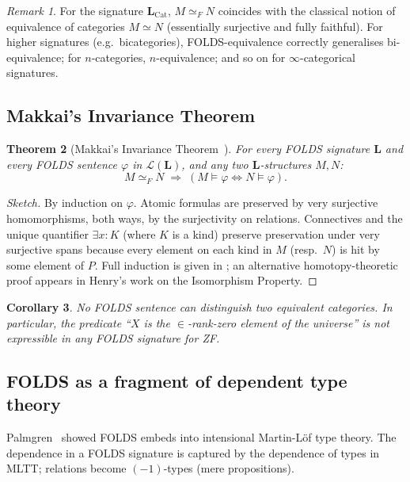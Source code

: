 \documentclass[12pt]{article}
\newtheorem{theorem}{Theorem}[section]
\newtheorem{corollary}[theorem]{Corollary}
\theoremstyle{definition}
\theoremstyle{remark}
\newtheorem{remark}[theorem]{Remark}
\begin{document}
\begin{remark}
For the signature $\mathbf{L}_{\mathrm{Cat}}$, $M\simeq_F N$ coincides with the
classical notion of equivalence of categories $M\simeq N$ (essentially surjective and
fully faithful). For higher signatures (e.g.\ bicategories), FOLDS-equivalence
correctly generalises bi-equivalence; for $n$-categories, $n$-equivalence; and so on for
$\infty$-categorical signatures.
\end{remark}

\subsection{Makkai's Invariance Theorem}

\begin{theorem}[Makkai's Invariance Theorem~\cite{Makkai1995}]
\label{thm:invariance}
For every FOLDS signature $\mathbf{L}$ and every FOLDS sentence $\varphi$ in
$\mathcal{L}(\mathbf{L})$, and any two $\mathbf{L}$-structures $M,N$:
\[
M\simeq_F N \;\Longrightarrow\; (M\models \varphi \Leftrightarrow N\models \varphi).
\]
\end{theorem}
\begin{proof}[Sketch]
By induction on $\varphi$. Atomic formulas are preserved by very surjective
homomorphisms, both ways, by the surjectivity on relations. Connectives and the unique
quantifier $\exists x: K$ (where $K$ is a kind) preserve preservation under very
surjective spans because every element on each kind in $M$ (resp.\ $N$) is hit by some
element of $P$. Full induction is given in
\cite[Theorem 4.4]{Makkai1995}; an alternative homotopy-theoretic proof appears in
Henry's work on the Isomorphism Property.
\end{proof}

\begin{corollary}
\label{cor:invariance}
No FOLDS sentence can distinguish two equivalent categories. In particular, the predicate
``$X$ is the $\in$-rank-zero element of the universe'' is \emph{not} expressible in any
FOLDS signature for ZF.
\end{corollary}

\subsection{FOLDS as a fragment of dependent type theory}

Palmgren~\cite{Palmgren2016} showed FOLDS embeds into intensional Martin-L\"of type
theory. The dependence in a FOLDS signature is captured by the dependence of types in
MLTT; relations become $(-1)$-types (mere propositions).
\end{document}
